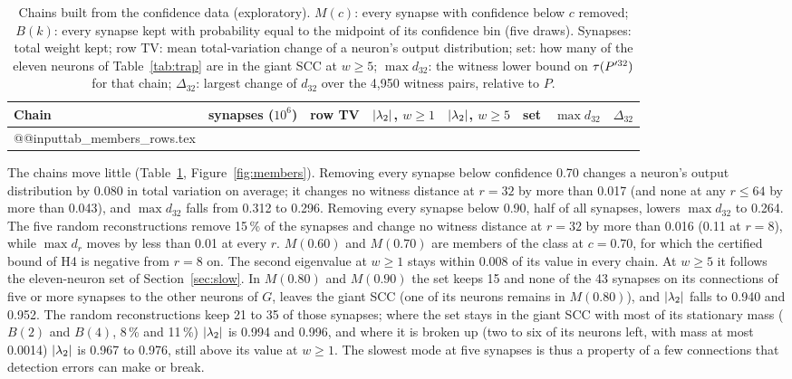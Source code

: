 \begin{table}[t]
\centering
\small
\caption{Chains built from the confidence data (exploratory). $M(c)$: every synapse with confidence
below $c$ removed; $B(k)$: every synapse kept with probability equal to the midpoint of its confidence bin
(five draws).
Synapses: total weight kept; row TV: mean total-variation change of a neuron's output distribution;
set: how many of the eleven neurons of Table~\ref{tab:trap} are in the giant SCC at $w\ge5$;
$\max d_{32}$: the witness lower bound on $\tau(P'^{32})$ for that chain; $\Delta_{32}$: largest
change of $d_{32}$ over the 4{,}950 witness pairs, relative to $P$.}
\label{tab:members}
\begin{tabular}{@{}lrrrrrrr@{}}
\toprule
Chain & synapses ($10^6$) & row TV & $\lvert\lambda_2\rvert$, $w\ge1$ & $\lvert\lambda_2\rvert$, $w\ge5$ & set & $\max d_{32}$ & $\Delta_{32}$ \\
\midrule
\csname @@input\endcsname tab_members_rows.tex
\bottomrule
\end{tabular}
\end{table}

The chains move little (Table~\ref{tab:members}, Figure~\ref{fig:members}). Removing every synapse
below confidence 0.70 changes a neuron's output distribution by 0.080 in total variation on average;
it changes no witness distance at $r=32$ by more than 0.017 (and none at any $r\le64$ by more than
0.043), and $\max d_{32}$ falls from 0.312 to 0.296. Removing every synapse below 0.90, half of all
synapses, lowers $\max d_{32}$ to 0.264. The five random reconstructions remove 15\,\% of the synapses
and change no witness distance at $r=32$ by more than 0.016 (0.11 at $r=8$), while $\max d_r$ moves
by less than 0.01 at every $r$. $M(0.60)$ and $M(0.70)$ are members of the class at $c=0.70$, for
which the certified bound of H4 is negative from $r=8$ on. The second eigenvalue at $w\ge1$ stays
within 0.008 of its value in every chain. At $w\ge5$ it follows the eleven-neuron set of
Section~\ref{sec:slow}. In $M(0.80)$ and $M(0.90)$ the set keeps 15 and none of the 43 synapses on
its connections of five or more synapses to the other neurons of $G$, leaves the giant SCC (one of its
neurons remains in $M(0.80)$), and $\lvert\lambda_2\rvert$ falls to 0.940 and 0.952. The random reconstructions
keep 21 to 35 of those synapses; where the set stays in the giant SCC with most of its stationary
mass ($B(2)$ and $B(4)$, 8\,\% and 11\,\%) $\lvert\lambda_2\rvert$ is 0.994 and 0.996, and where it is broken up
(two to six of its neurons left, with mass at most 0.0014) $\lvert\lambda_2\rvert$ is 0.967 to 0.976, still
above its value at $w\ge1$. The slowest mode at five synapses is thus a property of a few
connections that detection errors can make or break.

